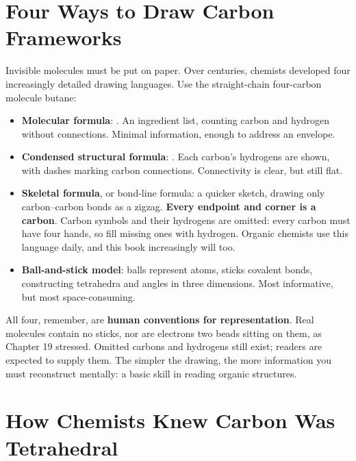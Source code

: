 \section{Four Ways to Draw Carbon Frameworks}

Invisible molecules must be put on paper. Over centuries, chemists developed four increasingly detailed drawing languages. Use the straight-chain four-carbon molecule butane:

\begin{itemize}[itemsep=2pt]
\item \textbf{Molecular formula}: . An ingredient list, counting carbon and hydrogen without connections. Minimal information, enough to address an envelope.
\item \textbf{Condensed structural formula}: . Each carbon's hydrogens are shown, with dashes marking carbon connections. Connectivity is clear, but still flat.
\item \textbf{Skeletal formula}, or bond-line formula: a quicker sketch, drawing only carbon--carbon bonds as a zigzag. \textbf{Every endpoint and corner is a carbon}. Carbon symbols and their hydrogens are omitted: every carbon must have four hands, so fill missing ones with hydrogen. Organic chemists use this language daily, and this book increasingly will too.
\item \textbf{Ball-and-stick model}: balls represent atoms, sticks covalent bonds, constructing tetrahedra and angles in three dimensions. Most informative, but most space-consuming.
\end{itemize}


All four, remember, are \textbf{human conventions for representation}. Real molecules contain no sticks, nor are electrons two beads sitting on them, as Chapter 19 stressed. Omitted carbons and hydrogens still exist; readers are expected to supply them. The simpler the drawing, the more information you must reconstruct mentally: a basic skill in reading organic structures.

\section{How Chemists Knew Carbon Was Tetrahedral}

